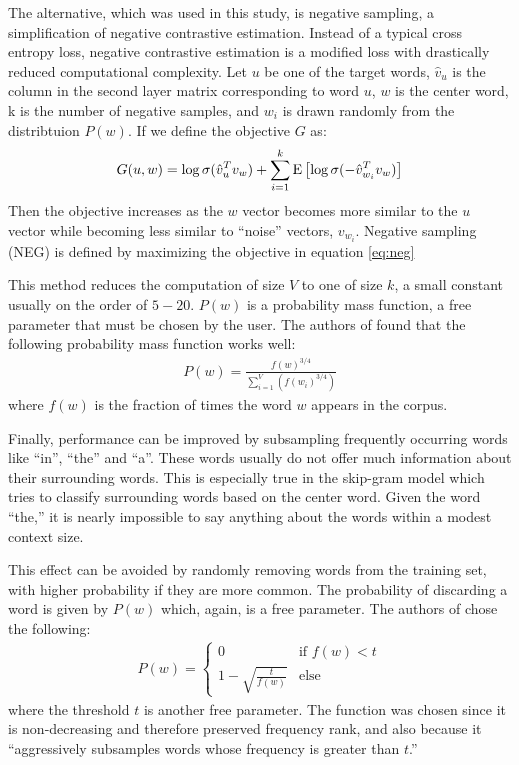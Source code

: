 The alternative, which was used in this study, is negative sampling, a simplification of negative contrastive estimation. \cite{mg12} Instead of a typical cross entropy loss, negative contrastive estimation is a modified loss with drastically reduced computational complexity.  Let $u$ be one of the target words, $\hat{v}_u$ is the column in the second layer matrix corresponding to word $u$, $w$ is the center word, k is the number of negative samples, and $w_i$ is drawn randomly from the distribtuion $P(w)$.  If we define the objective $G$ as:
\begin{align}\label{eq:neg}
G(u,w) = \log \sigma (\hat{v}_u^Tv_w) + \sum_{i=1}^{k} \E{\log\sigma(-\hat{v}_{w_i}^Tv_w)}
\end{align}
Then the objective increases as the $w$ vector becomes more similar to the $u$ vector while becoming less similar to ``noise'' vectors, $v_{w_i}$.
 Negative sampling (NEG) is defined by maximizing the objective in equation \ref{eq:neg}

This method reduces the computation of size $V$ to one of size $k$, a small constant usually on the order of $5-20$.  $P(w)$ is a probability mass function, a free parameter that must be chosen by the user.  The authors of \cite{tm13} found that the following probability mass function works well:
\begin{align}\label{eq:pmf}
P(w) = \frac{f(w)^{3/4}}{\sum_{i=1}^V(f(w_i)^{3/4})}
\end{align}
where $f(w)$ is the fraction of times the word $w$ appears in the corpus.  

Finally, performance can be improved by subsampling frequently occurring words like ``in'', ``the'' and ``a''.  These words usually do not offer much information about their surrounding words.  This is especially true in the skip-gram model which tries to classify surrounding words based on the center word.  Given the word ``the,'' it is nearly impossible to say anything about the words within a modest context size.

This effect can be avoided by randomly removing words from the training set, with higher probability if they are more common.  The probability of discarding a word is given by $P(w)$ which, again, is a free parameter.  The authors of \cite{tm13} chose the following:
\begin{align}\label{eq:subsample}
P(w) = 
\begin{cases}
0 & \text{if $f(w) < t$} \\
1 - \sqrt{\frac{t}{f(w)}} & \text{else}
\end{cases}
\end{align}
where the threshold $t$ is another free parameter.  The function was chosen since it is non-decreasing and therefore preserved frequency rank, and also because it ``aggressively subsamples words whose frequency is greater than $t$.'' \cite{tm13}
